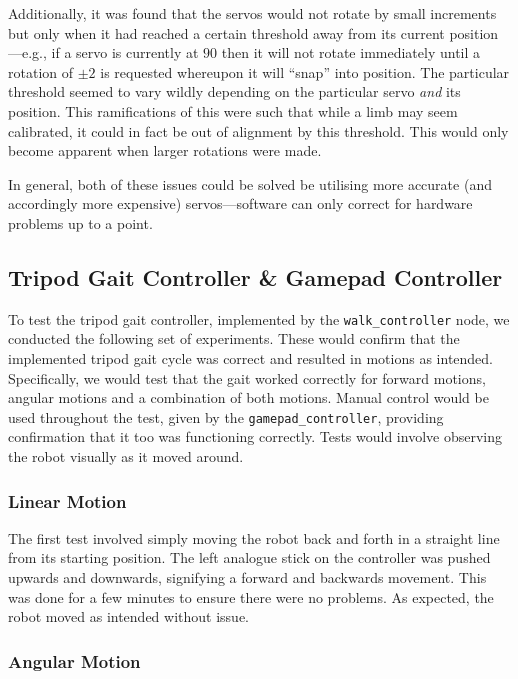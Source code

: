Additionally, it was found that the servos would not rotate by small increments but only when it had reached a certain threshold away from its current position---e.g., if a servo is currently at $90$\textdegree{} then it will not rotate immediately until a rotation of $\pm2$\textdegree{} is requested whereupon it will ``snap'' into position. The particular threshold seemed to vary wildly depending on the particular servo \emph{and} its position. This ramifications of this were such that while a limb may seem calibrated, it could in fact be out of alignment by this threshold. This would only become apparent when larger rotations were made.

In general, both of these issues could be solved be utilising more accurate (and accordingly more expensive) servos---software can only correct for hardware problems up to a point.

\subsection{Tripod Gait Controller \& Gamepad Controller}

To test the tripod gait controller, implemented by the \texttt{walk\_controller} node, we conducted the following set of experiments. These would confirm that the implemented tripod gait cycle was correct and resulted in motions as intended. Specifically, we would test that the gait worked correctly for forward motions, angular motions and a combination of both motions. Manual control would be used throughout the test, given by the \texttt{gamepad\_controller}, providing confirmation that it too was functioning correctly. Tests would involve observing the robot visually as it moved around.

\subsubsection{Linear Motion}

The first test involved simply moving the robot back and forth in a straight line from its starting position. The left analogue stick on the controller was pushed upwards and downwards, signifying a forward and backwards movement. This was done for a few minutes to ensure there were no problems. As expected, the robot moved as intended without issue.

\subsubsection{Angular Motion}

